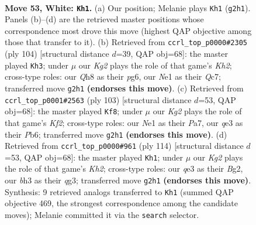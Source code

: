 \documentclass[11pt]{article}
\begin{document}
\clearpage

\begin{figure}[p]\centering
\begin{subfigure}{0.46\textwidth}\centering
\resizebox{\linewidth}{!}{%
\newchessgame
\chessboard[
  setfen={n6Q/8/8/1p4k1/7p/P2Pq2b/6K1/4N3 w - - 5 53},
  showmover=false,
  pgfstyle=straightmove, color=movearrow, markmove={g2-h1}
]}
\caption{}
\end{subfigure}\hfill
\begin{subfigure}{0.46\textwidth}\centering
\resizebox{\linewidth}{!}{%
\newchessgame
\chessboard[
  setfen={5k2/2Q5/6pp/3N1p2/7P/1P6/6PK/2q3b1 w - - 1 53},
  showmover=false,
  pgfstyle=straightmove, color=movearrow, markmove={h2-h3}
]}
\caption{}
\end{subfigure}
\\[4pt]
\begin{subfigure}{0.46\textwidth}\centering
\resizebox{\linewidth}{!}{%
\newchessgame
\chessboard[
  setfen={8/p4k2/1p2Q3/3p1P2/6K1/8/PP1q4/8 b - - 12 52},
  showmover=false,
  pgfstyle=straightmove, color=movearrow, markmove={f7-f8}
]}
\caption{}
\end{subfigure}\hfill
\begin{subfigure}{0.46\textwidth}\centering
\resizebox{\linewidth}{!}{%
\newchessgame
\chessboard[
  setfen={7k/2P5/7b/3Pp2Q/1P5p/6q1/6BK/8 w - - 20 58},
  showmover=false,
  pgfstyle=straightmove, color=movearrow, markmove={h2-h1}
]}
\caption{}
\end{subfigure}
\caption{\textbf{Move 53, White: \texttt{Kh1}.} (a) Our position; Melanie plays \texttt{Kh1} (\texttt{g2h1}). Panels (b)--(d) are the retrieved master positions whose correspondence most drove this move (highest QAP objective among those that transfer to it). (b) Retrieved from \texttt{ccrl\_top\_p0000\#2305} (ply 104) [structural distance $d$=39, QAP obj=68]: the master played \texttt{Kh3}; under $\mu$ our \emph{Kg2} plays the role of that game's \emph{Kh2}; cross-type roles: our \emph{Q}h8 as their \emph{p}g6, our \emph{N}e1 as their \emph{Q}c7; transferred move \texttt{g2h1} \textbf{(endorses this move)}. (c) Retrieved from \texttt{ccrl\_top\_p0001\#2563} (ply 103) [structural distance $d$=53, QAP obj=68]: the master played \texttt{Kf8}; under $\mu$ our \emph{Kg2} plays the role of that game's \emph{Kf2}; cross-type roles: our \emph{N}e1 as their \emph{P}a7, our \emph{q}e3 as their \emph{P}b6; transferred move \texttt{g2h1} \textbf{(endorses this move)}. (d) Retrieved from \texttt{ccrl\_top\_p0000\#961} (ply 114) [structural distance $d$=53, QAP obj=68]: the master played \texttt{Kh1}; under $\mu$ our \emph{Kg2} plays the role of that game's \emph{Kh2}; cross-type roles: our \emph{q}e3 as their \emph{B}g2, our \emph{b}h3 as their \emph{q}g3; transferred move \texttt{g2h1} \textbf{(endorses this move)}. Synthesis: 9 retrieved analogs transferred to \texttt{Kh1} (summed QAP objective 469, the strongest correspondence among the candidate moves); Melanie committed it via the \texttt{search} selector.}
\label{fig:thought-m104}
\end{figure}
\end{document}
